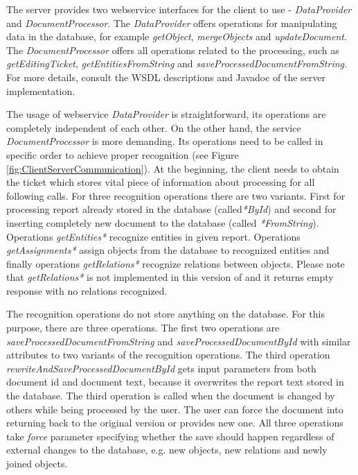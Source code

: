 The \textan{} server provides two webservice interfaces for the client to use -
\emph{DataProvider} and \emph{DocumentProcessor}. The
\emph{DataProvider} offers operations for manipulating data in the database,
for example \emph{getObject}, \emph{mergeObjects} and \emph{updateDocument}.
The \emph{DocumentProcessor} offers all operations related to the processing,
such as \emph{getEditingTicket}, \emph{getEntitiesFromString} and
\emph{saveProcessedDocumentFromString}.
For more details, consult the WSDL descriptions and Javadoc of the server
implementation.

The usage of webservice \emph{DataProvider} is straightforward, its operations
are completely independent of each other. On the other hand, the service
\emph{DocumentProcessor} is more demanding. Its operations need to be
called in specific order to achieve proper recognition (see Figure
\ref{fig:ClientServerCommunication}). At the beginning, the client needs to obtain
the ticket which stores vital piece of information about processing for all
following calls. For three recognition operations there are two variants. First
for processing report already stored in the database (called\emph{*ById}) and
second for inserting completely new document to the database (called
\emph{*FromString}). Operations \emph{getEntities*} recognize entities in
given report. Operations \emph{getAssignments*} assign objects from the database
to recognized entities and finally operations \emph{getRelations*} recognize
relations between objects. Please note that \emph{getRelations*} is not
implemented in this version of \textan{} and it returns empty response with no
relations recognized.

The recognition operations do not store anything on the database. For this
purpose, there are three operations. The first two operations are \emph{saveProcessedDocumentFromString} 
and \emph{saveProcessedDocumentById} with similar attributes to 
two variants of the recognition operations.
The third operation \emph{rewriteAndSaveProcessedDocumentById} gets input
parameters from both document id and document text, because it overwrites the report
text stored in the database. The third operation is called when the document is
changed by others while being processed by the user. The user can
force the document into returning back to the original version or provides new one. 
All three operations
take \emph{force} parameter specifying whether the save should happen regardless of
external changes to the database, e.g. new objects, new
relations and newly joined objects.

